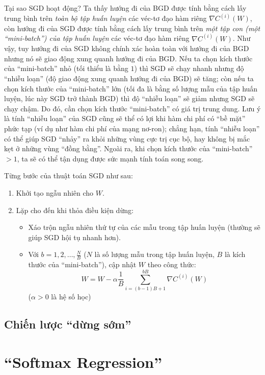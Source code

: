 Tại sao SGD hoạt động? Ta thấy hướng đi của BGD được tính bằng cách lấy trung bình trên \emph{toàn bộ tập huấn luyện} các véc-tơ đạo hàm riêng $\nabla C^{(i)}(W)$, còn hướng đi của SGD được tính bằng cách lấy trung bình trên \emph{một tập con (một ``mini-batch'') của tập huấn luyện} các véc-tơ đạo hàm riêng $\nabla C^{(i)}(W)$. Như vậy, tuy hướng đi của SGD không chính xác hoàn toàn với hướng đi của BGD nhưng nó sẽ giao động xung quanh hướng đi của BGD. Nếu ta chọn kích thước của ``mini-batch'' nhỏ (tối thiểu là bằng $1$) thì SGD sẽ chạy nhanh nhưng độ ``nhiễu loạn'' (độ giao động xung quanh hướng đi của BGD) sẽ tăng; còn nếu ta chọn kích thước của ``mini-batch'' lớn (tối đa là bằng số lượng mẫu của tập huấn luyện, lúc này SGD trở thành BGD) thì độ ``nhiễu loạn'' sẽ giảm nhưng SGD sẽ chạy chậm. Do đó, cần chọn kích thước ``mini-batch'' có giá trị trung dung. Lưu ý là tính ``nhiễu loạn'' của SGD cũng sẽ thể có lợi khi hàm chi phí có ``bề mặt'' phức tạp (ví dụ như hàm chi phí của mạng nơ-ron); chẳng hạn, tính ``nhiễu loạn'' có thể giúp SGD ``nhảy'' ra khỏi những vùng cực trị cục bộ, hay không bị mắc kẹt ở những vùng ``đồng bằng''. Ngoài ra, khi chọn kích thước của ``mini-batch'' $>1$, ta sẽ có thể tận dụng được sức mạnh tính toán song song.

\begin{leftbar}
Từng bước của thuật toán SGD như sau:
\begin{enumerate}
	\item Khởi tạo ngẫu nhiên cho $W$.
	\item Lặp cho đến khi thỏa điều kiện dừng:
	\begin{itemize}
		\item Xáo trộn ngẫu nhiên thứ tự của các mẫu trong tập huấn luyện (thường sẽ giúp SGD hội tụ nhanh hơn).
		\item Với $b=1,2,\ldots,\frac{N}{B}$ ($N$ là số lượng mẫu trong tập huấn luyện, $B$ là kích thước của ``mini-batch''), cập nhật $W$ theo công thức:
		\[W = W - \alpha \frac{1}{B} \sum_{i=(b-1)B+1}^{bB} \nabla C^{(i)}(W)\]
		($\alpha > 0$ là hệ số học)
	\end{itemize}
\end{enumerate}
\end{leftbar}
\subsection{Chiến lược ``dừng sớm''}
\section{``Softmax Regression''}